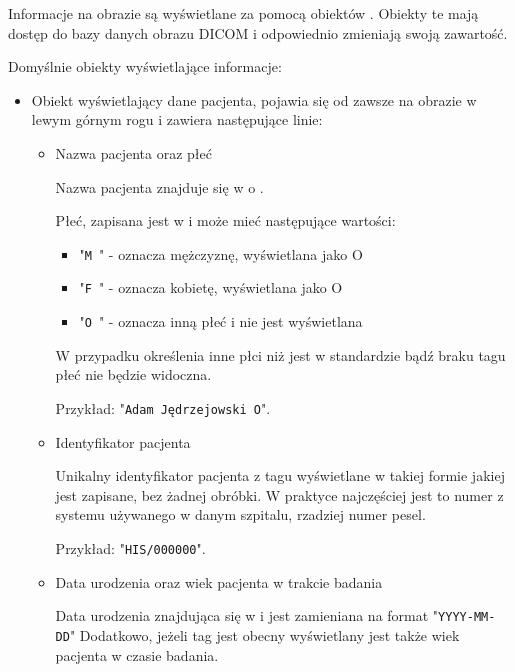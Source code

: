 Informacje na obrazie są wyświetlane za pomocą obiektów .
Obiekty te mają dostęp do bazy danych obrazu DICOM i odpowiednio zmieniają swoją zawartość.

Domyślnie obiekty wyświetlające informacje:
\begin{itemize}

    \item {}

    Obiekt wyświetlający dane pacjenta, pojawia się od zawsze na obrazie w lewym górnym rogu i zawiera następujące linie:
    \begin{itemize}
        \item Nazwa pacjenta oraz płeć

        Nazwa pacjenta znajduje się w  o .
        
        Płeć, zapisana jest w  i może mieć następujące wartości:
        \begin{itemize}
            \item "\texttt{M }" - oznacza mężczyznę, wyświetlana jako O
            \item "\texttt{F }" - oznacza kobietę, wyświetlana jako O
            \item "\texttt{O }" - oznacza inną płeć i nie jest wyświetlana
        \end{itemize}
        
        W przypadku określenia inne płci niż jest w standardzie bądź braku tagu płeć nie będzie widoczna.

        Przykład: "\texttt{Adam Jędrzejowski O}".

        \item Identyfikator pacjenta

        Unikalny identyfikator pacjenta z tagu  wyświetlane w takiej formie jakiej jest zapisane, bez żadnej obróbki.
        W praktyce najczęściej jest to numer z systemu używanego w danym szpitalu, rzadziej numer pesel.
        
        Przykład: "\texttt{HIS/000000}".

        \item Data urodzenia oraz wiek pacjenta w trakcie badania

        Data urodzenia znajdująca się w  i jest zamieniana na format "\texttt{YYYY-MM-DD}"
        Dodatkowo, jeżeli tag  jest obecny wyświetlany jest także wiek pacjenta w czasie badania.
    

\end{itemize}
\end{itemize}
